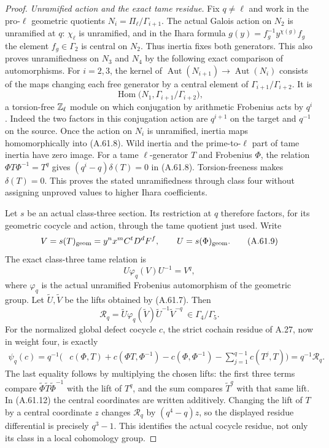 \begin{proof}
\emph{Unramified action and the exact tame residue.}
Fix $q\ne\ell$ and work in the pro-$\ell$ geometric
quotients $N_i=\Pi_\ell/\Gamma_{i+1}$.
The actual Galois action on $N_2$ is unramified at $q$:
$\chi_\ell$ is unramified, and in the Ihara formula
$g(y)=f_g^{-1}y^{\chi(g)}f_g$ the element $f_g\in\Gamma_2$
is central on $N_2$.  Thus inertia fixes both generators.
This also proves unramifiedness on $N_3$ and $N_4$ by
the following exact comparison of automorphisms.
For $i=2,3$, the kernel of
$\operatorname{Aut}(N_{i+1})\to\operatorname{Aut}(N_i)$
consists of the maps changing each free generator by
a central element of $\Gamma_{i+1}/\Gamma_{i+2}$.
It is
\[
 \operatorname{Hom}\bigl(N_1,\Gamma_{i+1}/\Gamma_{i+2}\bigr),
 \tag{A.61.8}
\]
a torsion-free $\mathbb Z_\ell$ module on which conjugation by
arithmetic Frobenius acts by $q^i$.
Indeed the two factors in this conjugation action are
$q^{i+1}$ on the target and $q^{-1}$ on the source.
Once the action on $N_i$ is unramified, inertia maps
homomorphically into (A.61.8).  Wild inertia and the
prime-to-$\ell$ part of tame inertia have zero image.
For a tame $\ell$-generator $T$ and Frobenius $\Phi$,
the relation $\Phi T\Phi^{-1}=T^q$ gives
$(q^i-q)\delta(T)=0$ in (A.61.8).  Torsion-freeness
makes $\delta(T)=0$.  This proves the stated
unramifiedness through class four without assigning
unproved values to higher Ihara coefficients.

Let $s$ be an actual class-three section.  Its restriction
at $q$ therefore factors, for its geometric cocycle and
action, through the tame quotient just used.
Write
\[
 V=s(T)_{\rm geom}=y^n x^m C^t D^dF^f,\qquad
 U=s(\Phi)_{\rm geom}.
 \tag{A.61.9}
\]
The exact class-three tame relation is
\[
                   U\varphi_q(V)U^{-1}=V^q,
 \tag{A.61.10}
\]
where $\varphi_q$ is the actual unramified Frobenius
automorphism of the geometric group.
Let $\widetilde U,\widetilde V$ be the lifts obtained
by (A.61.7).  Then
\[
 \mathcal R_q=\widetilde U\varphi_q(\widetilde V)
                          \widetilde U^{-1}\widetilde V^{-q}
                      \ \in\Gamma_4/\Gamma_5.
 \tag{A.61.11}
\]
For the normalized global defect cocycle $c$, the strict
cochain residue of A.27, now in weight four, is exactly
\[
 \begin{split}
 \psi_q(c)=q^{-1}\biggl(&c(\Phi,T)+c(\Phi T,\Phi^{-1})
          -c(\Phi,\Phi^{-1})
          -\sum_{j=1}^{q-1}c(T^j,T)\biggr)
                   =q^{-1}\mathcal R_q.
 \end{split}
 \tag{A.61.12}
\]
The last equality follows by multiplying the chosen lifts:
the first three terms compare
$\widetilde\Phi\widetilde T\widetilde\Phi^{-1}$
with the lift of $T^q$, and the sum compares
$\widetilde T^q$ with that same lift.
In (A.61.12) the central coordinates are written
additively.  Changing the lift of $T$ by a central
coordinate $z$ changes $\mathcal R_q$ by
$(q^4-q)z$, so the displayed residue differential is
precisely $q^3-1$.
This identifies the actual cocycle residue, not only
its class in a local cohomology group.


\end{proof}

